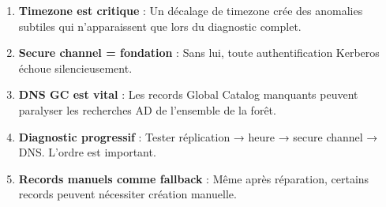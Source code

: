 \begin{enumerate}
    \item \textbf{Timezone est critique} : Un décalage de timezone crée des anomalies subtiles qui n'apparaissent que lors du diagnostic complet.
    
    \item \textbf{Secure channel = fondation} : Sans lui, toute authentification Kerberos échoue silencieusement.
    
    \item \textbf{DNS GC est vital} : Les records Global Catalog manquants peuvent paralyser les recherches AD de l'ensemble de la forêt.
    
    \item \textbf{Diagnostic progressif} : Tester réplication → heure → secure channel → DNS. L'ordre est important.
    
    \item \textbf{Records manuels comme fallback} : Même après réparation, certains records peuvent nécessiter création manuelle.
\end{enumerate}

